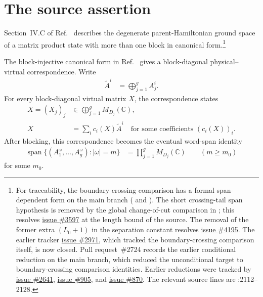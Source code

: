 \documentclass{article}
\begin{document}
\section{The source assertion}

Section~IV.C of Ref.~\cite{Cirac2021Matrix} describes the degenerate
parent-Hamiltonian ground space of a matrix product state with more than one
block in canonical form.\footnote{For traceability, the boundary-crossing
comparison has a formal span-dependent form on the main branch
( and
).
The short crossing-tail span hypothesis is removed by the global change-of-cut
comparison in
;
this resolves
\href{https://github.com/LionSR/TNLean/issues/3597}{issue \#3597} at the
length bound of the source. The removal of the former extra $(L_0+1)$ in the
separation constant resolves
\href{https://github.com/LionSR/TNLean/issues/4195}{issue \#4195}. The earlier
tracker
\href{https://github.com/LionSR/TNLean/issues/2971}{issue \#2971}, which
tracked the boundary-crossing comparison itself, is now closed. Pull
request~\#2724 records the earlier conditional reduction on the main branch,
which reduced the unconditional target to boundary-crossing comparison
identities. Earlier reductions were tracked by
\href{https://github.com/LionSR/TNLean/issues/2641}{issue \#2641},
\href{https://github.com/LionSR/TNLean/issues/905}{issue \#905}, and
\href{https://github.com/LionSR/TNLean/issues/870}{issue \#870}. The relevant
source lines are
:2112--2128.}

The block-injective canonical form in Ref.~\cite{Cirac2021Matrix} gives a
block-diagonal physical--virtual correspondence. Write
\begin{align}
  \widetilde A^i
    &=
    \bigoplus_{j=1}^g A_j^i.
  \label{eq:cpgsv21_block_diagonal_parent_ground_space_canonical_tensor}
\end{align}
For every block-diagonal virtual matrix $X$, the correspondence states
\begin{align}
  X=(X_j)_j
    &\in
    \bigoplus_{j=1}^g M_{D_j}(\mathbb C),
  \label{eq:cpgsv21_block_diagonal_parent_ground_space_virtual_matrix}\\
  X
    &=
    \sum_i c_i(X)\widetilde A^i
    \quad\text{for some coefficients }(c_i(X))_i.
  \label{eq:cpgsv21_block_diagonal_parent_ground_space_physical_virtual}
\end{align}
After blocking, this correspondence becomes the eventual word-span identity
\begin{align}
  \operatorname{span}
  \{(A_1^\omega,\ldots,A_g^\omega):|\omega|=m\}
    &=
    \prod_{j=1}^g M_{D_j}(\mathbb C)
    \qquad (m\geq m_0)
  \label{eq:cpgsv21_block_diagonal_parent_ground_space_eventual_tuple_span}
\end{align}
for some $m_0$.
\end{document}
